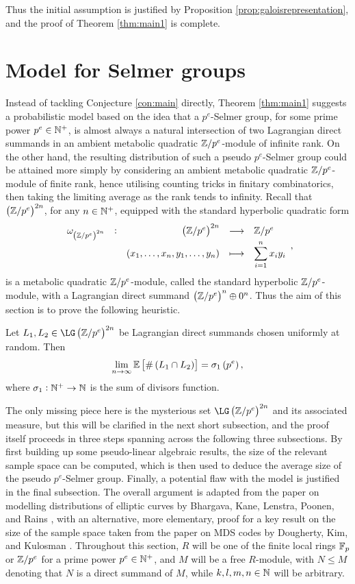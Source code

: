 Thus the initial assumption is justified by Proposition \ref{prop:galoisrepresentation}, and the proof of Theorem \ref{thm:main1} is complete.

\pagebreak

\section{Model for Selmer groups}

Instead of tackling Conjecture \ref{con:main} directly, Theorem \ref{thm:main1} suggests a probabilistic model based on the idea that a $ p^e $-Selmer group, for some prime power $ p^e \in \mathbb{N}^+ $, is almost always a natural intersection of two Lagrangian direct summands in an ambient metabolic quadratic $ \mathbb{Z} / p^e $-module of infinite rank. On the other hand, the resulting distribution of such a pseudo $ p^e $-Selmer group could be attained more simply by considering an ambient metabolic quadratic $ \mathbb{Z} / p^e $-module of finite rank, hence utilising counting tricks in finitary combinatorics, then taking the limiting average as the rank tends to infinity. Recall that $ \br{\ZZ / p^e}^{2n} $, for any $ n \in \mathbb{N}^+ $, equipped with the standard hyperbolic quadratic form
$$ \function[\omega_{\br{\ZZ / p^e}^{2n}}]{\br{\ZZ / p^e}^{2n}}{\ZZ / p^e}{\br{x_1, \dots, x_n, y_1, \dots, y_n}}{\displaystyle\sum_{i = 1}^n x_iy_i}, $$
is a metabolic quadratic $ \mathbb{Z} / p^e $-module, called the standard hyperbolic $ \mathbb{Z} / p^e $-module, with a Lagrangian direct summand $ \br{\ZZ / p^e}^n \oplus 0^n $. Thus the aim of this section is to prove the following heuristic.

\begin{theorem}
\label{thm:main2}
Let $ L_1, L_2 \in \LG\br{\ZZ / p^e}^{2n} $ be Lagrangian direct summands chosen uniformly at random. Then
$$ \lim_{n \to \infty} \EE\sbr{\#\br{L_1 \cap L_2}} = \sigma_1\br{p^e}, $$
where $ \sigma_1 : \mathbb{N}^+ \to \mathbb{N} $ is the sum of divisors function.
\end{theorem}

The only missing piece here is the mysterious set $ \LG\br{\ZZ / p^e}^{2n} $ and its associated measure, but this will be clarified in the next short subsection, and the proof itself proceeds in three steps spanning across the following three subsections. By first building up some pseudo-linear algebraic results, the size of the relevant sample space can be computed, which is then used to deduce the average size of the pseudo $ p^e $-Selmer group. Finally, a potential flaw with the model is justified in the final subsection. The overall argument is adapted from the paper on modelling distributions of elliptic curves by Bhargava, Kane, Lenstra, Poonen, and Rains \cite{BKLPR15}, with an alternative, more elementary, proof for a key result on the size of the sample space taken from the paper on MDS codes by Dougherty, Kim, and Kulosman \cite{DKK08}. Throughout this section, $ R $ will be one of the finite local rings $ \mathbb{F}_p $ or $ \mathbb{Z} / p^e $ for a prime power $ p^e \in \mathbb{N}^+ $, and $ M $ will be a free $ R $-module, with $ N \le M $ denoting that $ N $ is a direct summand of $ M $, while $ k, l, m, n \in \mathbb{N} $ will be arbitrary.

